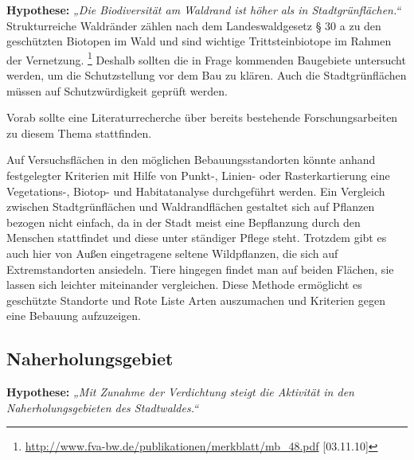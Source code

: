 \documentclass[12pt]{article}
\newcommand{\citefooturldate}[2]{\footnote{\url{#1} [#2]}}
\begin{document}
\textbf{Hypothese:} \textit{„Die Biodiversität am Waldrand ist höher als in Stadtgrünflächen.“} \\

\noindent Strukturreiche Waldränder zählen nach dem Landeswaldgesetz § 30 a zu den geschützten Biotopen 
im Wald und sind wichtige Trittsteinbiotope im Rahmen der Vernetzung. \citefooturldate{http://www.fva-bw.de/publikationen/merkblatt/mb_48.pdf}{03.11.10} 
Deshalb sollten die in Frage kommenden Baugebiete untersucht werden, um die Schutzstellung vor dem Bau zu klären. 
Auch die Stadtgrünflächen müssen auf Schutzwürdigkeit geprüft werden. 

Vorab sollte eine Literaturrecherche über bereits bestehende Forschungsarbeiten zu diesem Thema stattfinden. 

Auf Versuchsflächen in den möglichen Bebauungsstandorten könnte anhand festgelegter Kriterien mit Hilfe von 
Punkt-, Linien- oder Rasterkartierung eine Vegetations-, Biotop- und Habitatanalyse durchgeführt werden. 
Ein Vergleich zwischen Stadtgrünflächen und Waldrandflächen gestaltet sich auf Pflanzen bezogen nicht einfach, 
da in der Stadt meist eine Bepflanzung
durch den Menschen stattfindet und diese unter ständiger Pflege steht. Trotzdem gibt es auch hier von Außen eingetragene 
seltene Wildpflanzen, die sich auf Extremstandorten ansiedeln. Tiere hingegen findet man auf beiden Flächen, sie lassen sich 
leichter miteinander vergleichen.
Diese Methode ermöglicht es geschützte Standorte und Rote Liste Arten auszumachen und Kriterien gegen eine Bebauung aufzuzeigen. 

\subsection{Naherholungsgebiet}

\textbf{Hypothese:} \textit{„Mit Zunahme der Verdichtung steigt die Aktivität in den Naherholungsgebieten  des Stadtwaldes.“} \\
\end{document}
